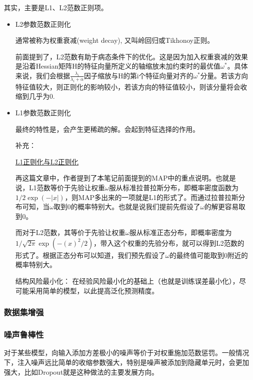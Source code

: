 其实，主要是L1、L2范数正则项。

\begin{itemize}
\item L2参数范数正则化

通常被称为权重衰减(weight decay), 又叫岭回归或Tikhonoy正则。

前面提到了，L2范数有助于病态条件下的优化。这是因为加入权重衰减的效果是沿着Hessian矩阵H的特征向量所定义的轴缩放未加约束时的最优值$\omega^{*}$。具体来说，我们会根据$\frac{\lambda_i}{\lambda_i+\alpha}$因子缩放与H的第i个特征向量对齐的$\omega^{*}$分量。若该方向特征值较大，则正则化的影响较小，若该方向的特征值较小，则该分量将会收缩到几乎为0.

\item L1参数范数正则化

最终的特性是，会产生更稀疏的解。会起到特征选择的作用。

补充：

\href{https://zhuanlan.zhihu.com/p/35356992}{L1正则化与L2正则化}

再这篇文章中，作者提到了本笔记前面提到的MAP中的重点说明。也就是说，L1范数等价于先验让权重$\omega$服从标准拉普拉斯分布，即概率密度函数为$1/2 \exp(-|x|)$，则MAP多出来的一项就是L1的形式了。而通过拉普拉斯分布可知，当$\omega$取到0的概率特别大。也就是说我们提前先假设了$\omega$的解更容易取到0。

而对于L2范数，其等价于先验让权重$\omega$服从标准正态分布，即概率密度为$1/\sqrt{2\pi} \exp(-(x)^2/2)$，带入这个权重的先验分布，就可以得到L2范数的形式了。根据正态分布可以知道，我们预先假设了$\omega$的最终值可能取到0附近的概率特别大。

结构风险最小化： 在经验风险最小化的基础上（也就是训练误差最小化），尽可能采用简单的模型，以此提高泛化预测精度。

\end{itemize}

\subsubsection{数据集增强}

\subsubsection{噪声鲁棒性}

对于某些模型，向输入添加方差极小的噪声等价于对权重施加范数惩罚。一般情况下，注入噪声远比简单的收缩参数强大，特别是噪声被添加到隐藏单元时，会更加强大，比如Dropout就是这种做法的主要发展方向。

